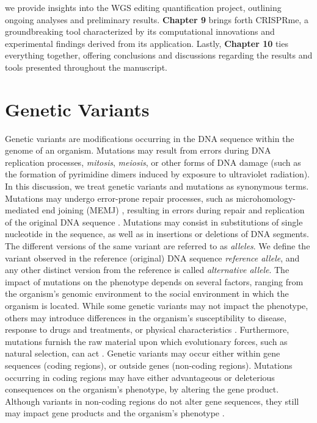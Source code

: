 \documentclass[a4paper, titlepage, openright]{book}
\newcommand{\mychapter}[2]{
    \setcounter{chapter}{#1}
    \setcounter{section}{0}
    \chapter*{#2}
    \addcontentsline{toc}{chapter}{#2}
}
\newcommand{\crisprme}{CRISPRme\xspace}
\begin{document}
we provide insights into the WGS editing quantification project, outlining ongoing analyses and preliminary results. \textbf{Chapter 9} brings forth \crisprme, a groundbreaking tool characterized by its computational innovations and experimental findings derived from its application. Lastly, \textbf{Chapter 10} ties everything together, offering conclusions and discussions regarding the results and tools presented throughout the manuscript.

 
%
\mychapter{2}{Genetic Variants}
Genetic variants are modifications occurring in the DNA sequence within the genome of an organism. Mutations may result from errors during DNA replication processes, \emph{mitosis}, \emph{meiosis}, or other forms of DNA damage (such as the formation of pyrimidine dimers induced by exposure to ultraviolet radiation). In this discussion, we treat genetic variants and mutations as synonymous terms. Mutations may undergo error-prone repair processes, such as microhomology-mediated end joining (MEMJ) \citep{sinha2017microhomology, seol2018microhomology}, resulting in errors during repair and replication of the original DNA sequence \citep{rodgers2016error}. Mutations may consist in substitutions of single nucleotide in the sequence, as well as in insertions or deletions of DNA segments. The different versions of the same variant are referred to as \emph{alleles}. We define the variant observed in the reference (original) DNA sequence \emph{reference allele}, and any other distinct version from the reference is called \emph{alternative allele}.
The impact of mutations on the phenotype depends on several factors, ranging from the organism's genomic environment to the social environment in which the organism is located. While some genetic variants may not impact the phenotype, others may introduce differences in the organism's susceptibility to disease, response to drugs and treatments, or physical characteristics \citep{bodmer2008common, ingelman2018integrating, mitchell2007evolutionary}. Furthermore, mutations furnish the raw material upon which evolutionary forces, such as natural selection, can act \citep{akey2004population, teotonio2009experimental}. Genetic variants may occur either within gene sequences (coding regions), or outside genes (non-coding regions).  Mutations occurring in coding regions may have either advantageous or deleterious consequences on the organism's phenotype, by altering the gene product. Although variants in non-coding regions do not alter gene sequences, they still may impact gene products and the organism's phenotype \citep{zhang2015non}. 
\end{document}
